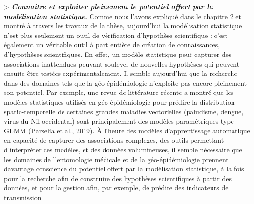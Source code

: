 \documentclass[12pt,twoside]{reedthesis}
\begin{document}
\textgreater{} \textbf{\emph{Connaître et exploiter pleinement le potentiel offert par la modélisation statistique.}} Comme nous l'avons expliqué dans le chapitre 2 et montré à travers les travaux de la thèse, aujourd'hui la modélisation statistique n'est plus seulement un outil de vérification d'hypothèse scientifique : c'est également un véritable outil à part entière de création de connaissances, d'hypothèses scientifiques. En effet, un modèle statistique peut capturer des associations inattendues pouvant soulever de nouvelles hypothèses qui peuvent ensuite être testées expérimentalement. Il semble aujourd'hui que la recherche dans des domaines tels que la géo-épidémiologie n'exploite pas encore pleinement son potentiel. Par exemple, une revue de littérature récente a montré que les modèles statistiques utilisés en géo-épidémiologie pour prédire la distribution spatio-temporelle de certaines grandes maladies vectorielles (paludisme, dengue, virus du Nil occidental) sont principalement des modèles paramétriques type GLMM (\protect\hyperlink{ref-parselia_satellite_2019}{Parselia et al., 2019}). À l'heure des modèles d'apprentissage automatique en capacité de capturer des associations complexes, des outils permettant d'interpréter ces modèles, et des données volumineuses, il semble nécessaire que les domaines de l'entomologie médicale et de la géo-épidémiologie prennent davantage conscience du potentiel offert par la modélisation statistique, à la fois pour la recherche afin de construire des hypothèses scientifiques à partir des données, et pour la gestion afin, par exemple, de prédire des indicateurs de transmission.\\
\end{document}
